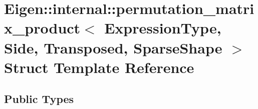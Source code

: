 \hypertarget{struct_eigen_1_1internal_1_1permutation__matrix__product_3_01_expression_type_00_01_side_00_01_t20ccd76e9ac5a7579d51cf9e9a5cbb67}{}\section{Eigen\+::internal\+::permutation\+\_\+matrix\+\_\+product$<$ Expression\+Type, Side, Transposed, Sparse\+Shape $>$ Struct Template Reference}
\label{struct_eigen_1_1internal_1_1permutation__matrix__product_3_01_expression_type_00_01_side_00_01_t20ccd76e9ac5a7579d51cf9e9a5cbb67}
\subsection*{Public Types}
